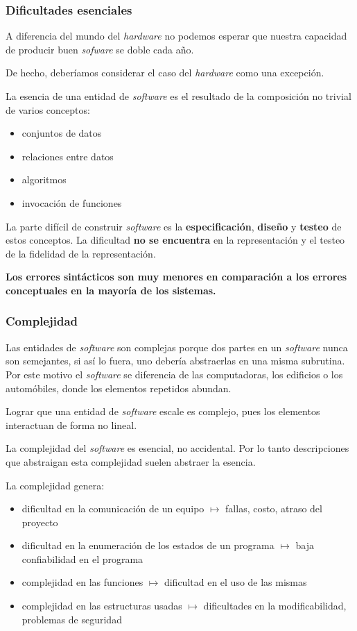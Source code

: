\documentclass{beamer}
\begin{document}
\begin{frame}[fragile]
  \frametitle{Dificultades esenciales}

  A diferencia del mundo del \textit{hardware} no podemos esperar que nuestra
  capacidad de producir buen \textit{sofware} se doble cada a\~no.

  De hecho, deber\'iamos considerar el caso del \textit{hardware} como una
  excepci\'on.

  La esencia de una entidad de \textit{software} es el resultado de la
  composici\'on no trivial de varios conceptos:
  \begin{itemize}
    \item conjuntos de datos
    \item relaciones entre datos
    \item algoritmos
    \item invocaci\'on de funciones
  \end{itemize}

  La parte dif\'icil de construir \textit{software} es la
  \textbf{especificaci\'on}, \textbf{dise\~no} y \textbf{testeo} de estos
  conceptos.
  La dificultad \textbf{no se encuentra} en la representaci\'on y el testeo
  de la fidelidad de la representaci\'on.

  \textbf{Los errores sint\'acticos son muy menores en comparaci\'on a los
  errores conceptuales en la mayor\'ia de los sistemas.}
\end{frame}


\begin{frame}[fragile]
  \frametitle{Complejidad}

  Las entidades de \textit{software} son complejas porque dos partes en un
  \textit{software} nunca son semejantes, si as\'i lo fuera, uno deber\'ia
  abstraerlas en una misma subrutina. Por este motivo el \textit{software}
  se diferencia de las computadoras, los edificios o los autom\'obiles, donde
  los elementos repetidos abundan.

  Lograr que una entidad de \textit{software} escale es complejo, pues los
  elementos interactuan de forma no lineal.

  La complejidad del \textit{software} es esencial, no accidental. Por lo tanto
  descripciones que abstraigan esta complejidad suelen abstraer la esencia.

  La complejidad genera:
  \begin{itemize}
    \item dificultad en la comunicaci\'on de un equipo
      $\mapsto$ fallas, costo, atraso del proyecto
    \item dificultad en la enumeraci\'on de los estados de un programa
      $\mapsto$ baja confiabilidad en el programa
    \item complejidad en las funciones
      $\mapsto$ dificultad en el uso de las mismas
    \item complejidad en las estructuras usadas
      $\mapsto$ dificultades en la modificabilidad, problemas de seguridad
  \end{itemize}

\end{frame}
\end{document}
